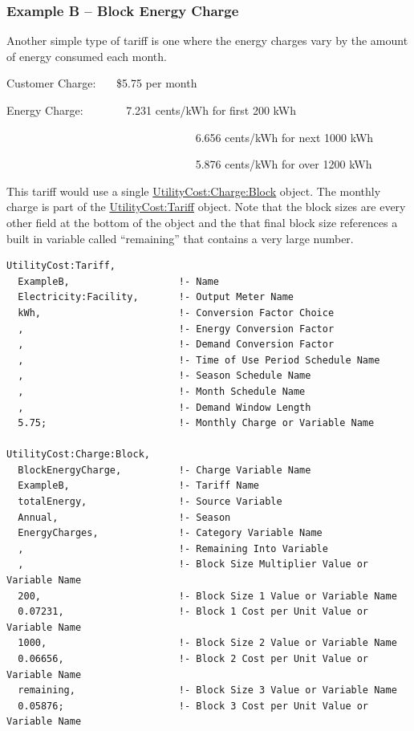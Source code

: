 \subsubsection{Example B -- Block Energy Charge}\label{example-b-block-energy-charge}

Another simple type of tariff is one where the energy charges vary by the amount of energy consumed each month.

Customer Charge:~~~ \$5.75 per month

Energy Charge:~~~~~~~ 7.231 cents/kWh for first 200 kWh

~~~~~~~~~~~~~~~~~~~~~~~~~~~~~~~~~ 6.656 cents/kWh for next 1000 kWh

~~~~~~~~~~~~~~~~~~~~~~~~~~~~~~~~~ 5.876 cents/kWh for over 1200 kWh

This tariff would use a single \hyperref[utilitycostchargeblock]{UtilityCost:Charge:Block} object. The monthly charge is part of the \hyperref[utilitycosttariff]{UtilityCost:Tariff} object. Note that the block sizes are every other field at the bottom of the object and the that final block size references a built in variable called ``remaining'' that contains a very large number.

\begin{lstlisting}
UtilityCost:Tariff,
  ExampleB,                   !- Name
  Electricity:Facility,       !- Output Meter Name
  kWh,                        !- Conversion Factor Choice
  ,                           !- Energy Conversion Factor
  ,                           !- Demand Conversion Factor
  ,                           !- Time of Use Period Schedule Name
  ,                           !- Season Schedule Name
  ,                           !- Month Schedule Name
  ,                           !- Demand Window Length
  5.75;                       !- Monthly Charge or Variable Name

UtilityCost:Charge:Block,
  BlockEnergyCharge,          !- Charge Variable Name
  ExampleB,                   !- Tariff Name
  totalEnergy,                !- Source Variable
  Annual,                     !- Season
  EnergyCharges,              !- Category Variable Name
  ,                           !- Remaining Into Variable
  ,                           !- Block Size Multiplier Value or Variable Name
  200,                        !- Block Size 1 Value or Variable Name
  0.07231,                    !- Block 1 Cost per Unit Value or Variable Name
  1000,                       !- Block Size 2 Value or Variable Name
  0.06656,                    !- Block 2 Cost per Unit Value or Variable Name
  remaining,                  !- Block Size 3 Value or Variable Name
  0.05876;                    !- Block 3 Cost per Unit Value or Variable Name
\end{lstlisting}

